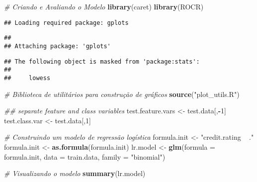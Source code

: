 \documentclass[
]{article}
\newenvironment{Shaded}{\begin{snugshade}}{\end{snugshade}}
\newcommand{\CommentTok}[1]{\textcolor[rgb]{0.56,0.35,0.01}{\textit{#1}}}
\newcommand{\DataTypeTok}[1]{\textcolor[rgb]{0.13,0.29,0.53}{#1}}
\newcommand{\DecValTok}[1]{\textcolor[rgb]{0.00,0.00,0.81}{#1}}
\newcommand{\KeywordTok}[1]{\textcolor[rgb]{0.13,0.29,0.53}{\textbf{#1}}}
\newcommand{\NormalTok}[1]{#1}
\newcommand{\OperatorTok}[1]{\textcolor[rgb]{0.81,0.36,0.00}{\textbf{#1}}}
\newcommand{\StringTok}[1]{\textcolor[rgb]{0.31,0.60,0.02}{#1}}
\begin{document}
\begin{Shaded}
\begin{Highlighting}[]
\CommentTok{# Criando e Avaliando o Modelo}
\KeywordTok{library}\NormalTok{(caret) }
\KeywordTok{library}\NormalTok{(ROCR) }
\end{Highlighting}
\end{Shaded}

\begin{verbatim}
## Loading required package: gplots
\end{verbatim}

\begin{verbatim}
## 
## Attaching package: 'gplots'
\end{verbatim}

\begin{verbatim}
## The following object is masked from 'package:stats':
## 
##     lowess
\end{verbatim}

\begin{Shaded}
\begin{Highlighting}[]
\CommentTok{# Biblioteca de utilitários para construção de gráficos}
\KeywordTok{source}\NormalTok{(}\StringTok{"plot_utils.R"}\NormalTok{) }

\CommentTok{## separate feature and class variables}
\NormalTok{test.feature.vars <-}\StringTok{ }\NormalTok{test.data[,}\OperatorTok{-}\DecValTok{1}\NormalTok{]}
\NormalTok{test.class.var <-}\StringTok{ }\NormalTok{test.data[,}\DecValTok{1}\NormalTok{]}

\CommentTok{# Construindo um modelo de regressão logística}
\NormalTok{formula.init <-}\StringTok{ "credit.rating ~ ."}
\NormalTok{formula.init <-}\StringTok{ }\KeywordTok{as.formula}\NormalTok{(formula.init)}
\NormalTok{lr.model <-}\StringTok{ }\KeywordTok{glm}\NormalTok{(}\DataTypeTok{formula =}\NormalTok{ formula.init, }\DataTypeTok{data =}\NormalTok{ train.data, }\DataTypeTok{family =} \StringTok{"binomial"}\NormalTok{)}

\CommentTok{# Visualizando o modelo}
\KeywordTok{summary}\NormalTok{(lr.model)}
\end{Highlighting}
\end{Shaded}
\end{document}
